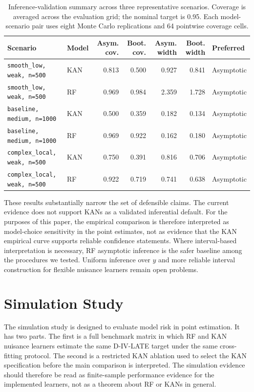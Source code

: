 \documentclass[final,3p,fleqn, 10pt]{elsarticle}
\begin{document}
\begin{table}[htbp]
\centering
\caption{Inference-validation summary across three representative scenarios. Coverage is averaged across the evaluation grid; the nominal target is 0.95. Each model-scenario pair uses eight Monte Carlo replications and 64 pointwise coverage cells.}
\label{tab:inference_summary}
\small
\begin{tabular}{@{}llrrrrl@{}}
\toprule
Scenario & Model & Asym. cov. & Boot. cov. & Asym. width & Boot. width & Preferred \\
\midrule
\texttt{smooth\_low, weak, n=500} & KAN & 0.813 & 0.500 & 0.927 & 0.841 & Asymptotic \\
\texttt{smooth\_low, weak, n=500} & RF  & 0.969 & 0.984 & 2.359 & 1.728 & Asymptotic \\
\texttt{baseline, medium, n=1000} & KAN & 0.500 & 0.359 & 0.182 & 0.134 & Asymptotic \\
\texttt{baseline, medium, n=1000} & RF  & 0.969 & 0.922 & 0.162 & 0.180 & Asymptotic \\
\texttt{complex\_local, weak, n=500} & KAN & 0.750 & 0.391 & 0.816 & 0.706 & Asymptotic \\
\texttt{complex\_local, weak, n=500} & RF  & 0.922 & 0.719 & 0.741 & 0.638 & Asymptotic \\
\bottomrule
\end{tabular}
\end{table}

These results substantially narrow the set of defensible claims. The current evidence does not support KANs as a validated inferential default. For the purposes of this paper, the empirical comparison is therefore interpreted as model-choice sensitivity in the point estimates, not as evidence that the KAN empirical curve supports reliable confidence statements. Where interval-based interpretation is necessary, RF asymptotic inference is the safer baseline among the procedures we tested. Uniform inference over $y$ and more reliable interval construction for flexible nuisance learners remain open problems.

\section{Simulation Study}
\label{sec:simulations}

The simulation study is designed to evaluate model risk in point estimation. It has two parts. The first is a full benchmark matrix in which RF and KAN nuisance learners estimate the same D-IV-LATE target under the same cross-fitting protocol. The second is a restricted KAN ablation used to select the KAN specification before the main comparison is interpreted. The simulation evidence should therefore be read as finite-sample performance evidence for the implemented learners, not as a theorem about RF or KANs in general.
\end{document}
